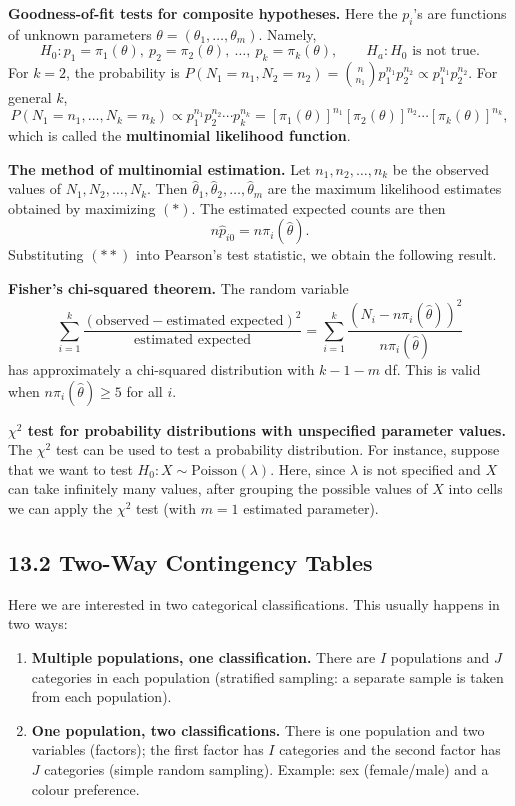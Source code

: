 \textbf{Goodness-of-fit tests for composite hypotheses.} Here the $p_i$'s are functions of unknown parameters $\theta=(\theta_1,\dots,\theta_m)$. Namely,
\[
H_0: p_1=\pi_1(\theta),\ p_2=\pi_2(\theta),\ \dots,\ p_k=\pi_k(\theta),\qquad H_a: H_0 \text{ is not true}.
\]
For $k=2$, the probability is
$P(N_1=n_1,N_2=n_2)=\binom{n}{n_1}p_1^{n_1}p_2^{n_2}\propto p_1^{n_1}p_2^{n_2}$.
For general $k$,
\[
P(N_1=n_1,\dots,N_k=n_k)\propto p_1^{n_1}p_2^{n_2}\cdots p_k^{n_k}
=[\pi_1(\theta)]^{n_1}[\pi_2(\theta)]^{n_2}\cdots[\pi_k(\theta)]^{n_k}, \tag{$*$}
\]
which is called the \textbf{multinomial likelihood function}.

\textbf{The method of multinomial estimation.} Let $n_1,n_2,\dots,n_k$ be the observed values of $N_1,N_2,\dots,N_k$.
Then $\hat\theta_1,\hat\theta_2,\dots,\hat\theta_m$ are the maximum likelihood estimates obtained by maximizing $(*)$.
The estimated expected counts are then
\[
n\hat{p}_{i0}=n\pi_i(\hat\theta). \tag{$**$}
\]
Substituting $(**)$ into Pearson's test statistic, we obtain the following result.

\textbf{Fisher's chi-squared theorem.} The random variable
\[
\sum_{i=1}^k\frac{(\text{observed}-\text{estimated expected})^2}{\text{estimated expected}}
=\sum_{i=1}^k\frac{(N_i-n\pi_i(\hat\theta))^2}{n\pi_i(\hat\theta)}
\]
has approximately a chi-squared distribution with $k-1-m$ df. This is valid when $n\pi_i(\hat\theta)\ge5$ for all $i$.

\textbf{$\chi^2$ test for probability distributions with unspecified parameter values.}
The $\chi^2$ test can be used to test a probability distribution. For instance, suppose that we want to test
$H_0:X\sim\text{Poisson}(\lambda)$. Here, since $\lambda$ is not specified and $X$ can take infinitely many values,
after grouping the possible values of $X$ into cells we can apply the $\chi^2$ test (with $m=1$ estimated parameter).

\subsection*{13.2 Two-Way Contingency Tables}

Here we are interested in two categorical classifications. This usually happens in two ways:
\begin{enumerate}
  \item \textbf{Multiple populations, one classification.} There are $I$ populations and $J$ categories in each population (stratified sampling: a separate sample is taken from each population).
  \item \textbf{One population, two classifications.} There is one population and two variables (factors); the first factor has $I$ categories and the second factor has $J$ categories (simple random sampling). Example: sex (female/male) and a colour preference.
\end{enumerate}


